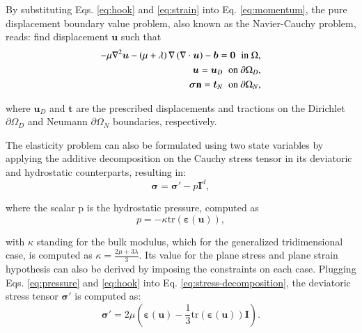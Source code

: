 \documentclass[english,11pt,3p,number,sort&compress]{elsarticle}
\begin{document}
By substituting Eqs. \eqref{eq:hook} and \eqref{eq:strain} into Eq. \eqref{eq:momentum}, the pure displacement boundary value problem, also known as the Navier-Cauchy problem, reads: find displacement $\bm{u}$ such that
\begin{subequations} \label{eq:navier-cauchy}
	\begin{align}
		-\mu\nabla^2\bm{u} -\left(\mu+\lambda \right)\nabla\left(\nabla \cdot \bm{u} \right) - \bm{b} = \bm{0} \hspace{0.2cm} \text{in } \Omega ,&\\
		\bm{u} = \bm{u}_D \hspace{0.2cm} \text{on } \partial\Omega_D ,&\\
		\bm{\sigma} \mathbf{n} = \bm{t}_N \hspace{0.2cm} \text{on } \partial\Omega_N ,&
	\end{align}
\end{subequations}

\noindent where $\bm{u}_D$ and $\bm{t}$ are the prescribed displacements and tractions on the Dirichlet $\partial\Omega_D$ and Neumann $\partial\Omega_N$ boundaries, respectively.

The elasticity problem can also be formulated using two state variables by applying the additive decomposition on the Cauchy stress tensor in its deviatoric and hydrostatic counterparts, resulting in:
\begin{equation} \label{eq:stress-decomposition}
	\bm{\sigma} = \bm{\sigma}' - p\bm{I}^d ,
\end{equation}

\noindent where the scalar p is the hydrostatic pressure, computed as
\begin{equation} \label{eq:pressure}
	p = -\kappa \text{tr}(\bm{\varepsilon}(\bm{u})) ,
\end{equation}

\noindent with $\kappa$ standing for the bulk modulus, which for the generalized tridimensional case, is computed as $\kappa=\frac{2\mu+3\lambda}{3}$. Its value for the plane stress and plane strain hypothesis can also be derived by imposing the constraints on each case. Plugging Eqs. \eqref{eq:pressure} and \eqref{eq:hook} into Eq. \eqref{eq:stress-decomposition}, the deviatoric stress tensor $\boldsymbol{\sigma}'$ is computed as:
\begin{equation} \label{eq:deviatoric-stress}
	\boldsymbol{\sigma}' = 2\mu \left(\boldsymbol{\varepsilon}(\bm{u}) - \frac{1}{3}\text{tr}(\boldsymbol{\varepsilon}(\bm{u}))\mathbf{I}\right) \text{.}
\end{equation}
\end{document}
